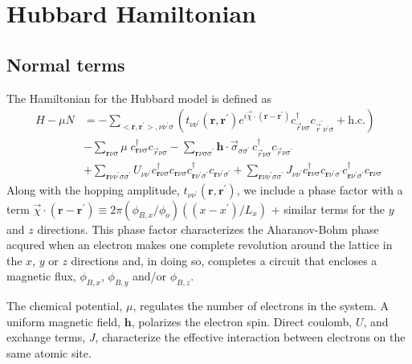 \chapter{Hubbard Hamiltonian}
\label{chapter:hubbard}

\section{Normal terms}
\label{section:hubbard-normal}
The Hamiltonian for the Hubbard model is defined as 
\begin{equation}
\begin{split}
H - \mu N &= -\sum_{<\mathbf{r},\mathbf{r}^{\prime}>,\nu\nu^{\prime}\sigma}  
\left(t_{\nu\nu^{\prime}}(\mathbf{r},\mathbf{r}^{\prime})
e^{i \vec{\chi}\cdot (\mathbf{r}-\mathbf{r}^{\prime})}  
c^{\dagger}_{\vec{r}\nu\sigma}c_{\vec{r}^{\prime}\nu^{\prime}\sigma} + 
\mathrm{h.c.} \right) \\
& - \sum_{\mathbf{r}\nu\sigma} \mu \; c^{\dagger}_{\mathbf{r}\nu\sigma}c_{\vec{r}\nu\sigma} 
 -\sum_{\mathbf{r}\nu\sigma\sigma^{\prime}} \mathbf{h}\cdot 
\vec{\sigma}_{\sigma\sigma^{\prime}} 
\, c^{\dagger}_{\vec{r}\nu\sigma} c_{\vec{r}\nu\sigma^{\prime}} \\
& + \sum_{\mathbf{r}\nu\nu^{\prime}\sigma\sigma^{\prime}} U_{\nu\nu^{\prime}} 
c^{\dagger}_{\mathbf{r}\nu\sigma}c_{\mathbf{r}\nu\sigma}
c^{\dagger}_{\mathbf{r}\nu^{\prime}\sigma^{\prime}}c_{\mathbf{r}\nu^{\prime}\sigma^{\prime}} 
+ \sum_{\mathbf{r}\nu\nu^{\prime}\sigma\sigma^{\prime}} J_{\nu\nu^{\prime}}
c^{\dagger}_{\mathbf{r}\nu\sigma}c_{\mathbf{r}\nu^{\prime}\sigma^{\prime}}
c^{\dagger}_{\mathbf{r}\nu^{\prime}\sigma^{\prime}}c_{\mathbf{r}\nu\sigma}
\end{split}
\end{equation}
Along with the hopping amplitude, 
$t_{\nu\nu^{\prime}}(\mathbf{r},\mathbf{r}^{\prime})$, 
we include a phase factor with a term
$\vec{\chi}\cdot(\mathbf{r}-\mathbf{r}^{\prime}) 
\equiv 2 \pi (\phi_{B,x} / \phi_o)( (x-x^{\prime})/ L_x)$
+ similar terms for the $y$ and $z$ directions.
This phase factor characterizes the Aharanov-Bohm
phase acqured when an electron makes one complete revolution
around the lattice in the $x$, $y$ or
$z$ directions and, in doing
so, completes a circuit that encloses a magnetic
flux, $\phi_{B,x}$, $\phi_{B,y}$ and/or $\phi_{B,z}$. 

The chemical potential, $\mu$, regulates the number of
electrons in the system.  A uniform magnetic field, $\mathbf{h}$,
polarizes the electron spin.
Direct coulomb, $U$, and exchange terms, $J$, characterize the 
effective interaction between electrons on the same atomic site.

